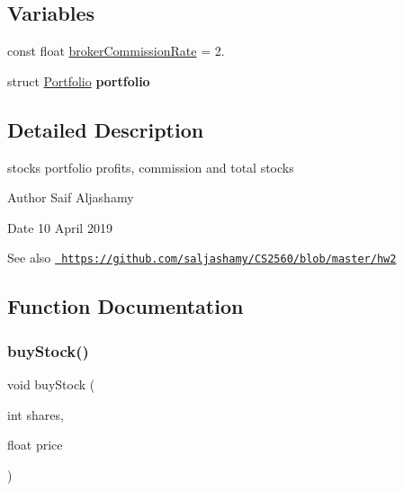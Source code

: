 \subsection*{Variables}
\begin{DoxyCompactItemize}
\item 
const float \mbox{\hyperlink{3-stock-trading_8c_aac2ecb218f5356fcdeefb48d44b6ec59}{broker\+Commission\+Rate}} = 2.
\item 
\mbox{\label{3-stock-trading_8c_a2ce74d41df40a1b67f4a0c26090476b3}} 
struct \mbox{\hyperlink{structPortfolio}{Portfolio}} {\bfseries portfolio}
\end{DoxyCompactItemize}


\subsection{Detailed Description}
stock\textquotesingle{}s portfolio profits, commission and total stocks 

\begin{DoxyAuthor}{Author}
Saif Aljashamy 
\end{DoxyAuthor}
\begin{DoxyDate}{Date}
10 April 2019 
\end{DoxyDate}
\begin{DoxySeeAlso}{See also}
\href{https://github.com/saljashamy/CS2560/blob/master/hw2}{\texttt{ https\+://github.\+com/saljashamy/\+C\+S2560/blob/master/hw2}} 
\end{DoxySeeAlso}


\subsection{Function Documentation}
\mbox{\label{3-stock-trading_8c_a0ad5bbbc852c2a958c530e2a37db54a5}} 
\subsubsection{\texorpdfstring{buyStock()}{buyStock()}}
{\footnotesize\ttfamily void buy\+Stock (\begin{DoxyParamCaption}\item[{int}]{shares,  }\item[{float}]{price }\end{DoxyParamCaption})}



